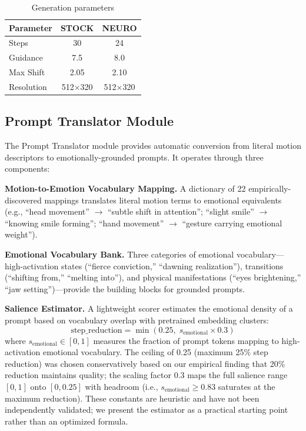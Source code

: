 \documentclass[10pt,twocolumn,letterpaper]{article}
\begin{document}
\begin{table}[t]
\centering
\small
\begin{tabular}{lcc}
\toprule
\textbf{Parameter} & \textbf{STOCK} & \textbf{NEURO} \\
\midrule
Steps & 30 & 24 \\
Guidance & 7.5 & 8.0 \\
Max Shift & 2.05 & 2.10 \\
Resolution & 512$\times$320 & 512$\times$320 \\
\bottomrule
\end{tabular}
\caption{Generation parameters}
\end{table}

\subsection{Prompt Translator Module}

The Prompt Translator module provides automatic conversion from literal motion descriptors to emotionally-grounded prompts. It operates through three components:

\textbf{Motion-to-Emotion Vocabulary Mapping.} A dictionary of 22 empirically-discovered mappings translates literal motion terms to emotional equivalents (e.g., ``head movement'' $\rightarrow$ ``subtle shift in attention''; ``slight smile'' $\rightarrow$ ``knowing smile forming''; ``hand movement'' $\rightarrow$ ``gesture carrying emotional weight'').

\textbf{Emotional Vocabulary Bank.} Three categories of emotional vocabulary---high-activation states (``fierce conviction,'' ``dawning realization''), transitions (``shifting from,'' ``melting into''), and physical manifestations (``eyes brightening,'' ``jaw setting'')---provide the building blocks for grounded prompts.

\textbf{Salience Estimator.} A lightweight scorer estimates the emotional density of a prompt based on vocabulary overlap with pretrained embedding clusters:
\begin{equation}
\text{step\_reduction} = \min(0.25, \; s_{\text{emotional}} \times 0.3)
\end{equation}
where $s_{\text{emotional}} \in [0,1]$ measures the fraction of prompt tokens mapping to high-activation emotional vocabulary. The ceiling of 0.25 (maximum 25\% step reduction) was chosen conservatively based on our empirical finding that 20\% reduction maintains quality; the scaling factor 0.3 maps the full salience range $[0,1]$ onto $[0, 0.25]$ with headroom (i.e., $s_{\text{emotional}} \geq 0.83$ saturates at the maximum reduction). These constants are heuristic and have not been independently validated; we present the estimator as a practical starting point rather than an optimized formula.
\end{document}
